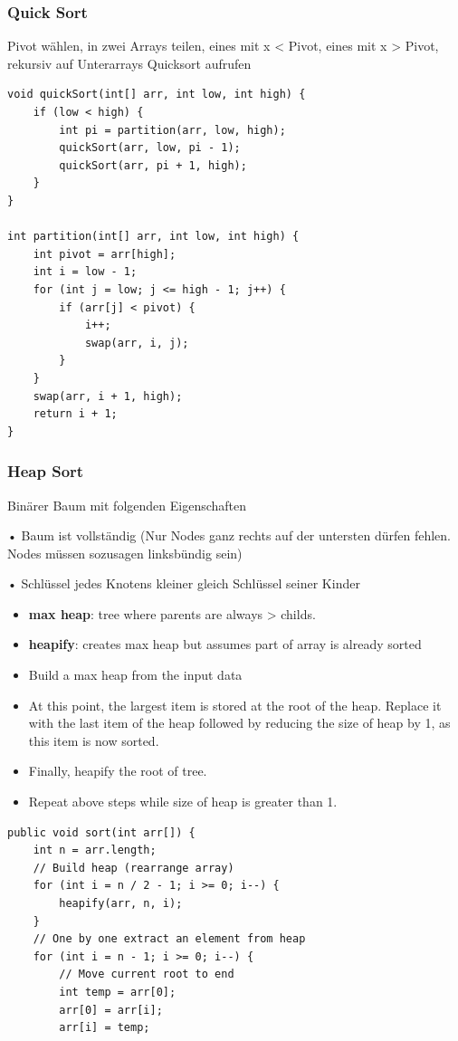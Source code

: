 \begin{multicols*}{4}
		\subsubsection{Quick Sort}
		Pivot wählen, in zwei Arrays teilen, eines mit x < Pivot, eines mit x > Pivot, rekursiv auf Unterarrays Quicksort aufrufen
			\begin{lstlisting}
void quickSort(int[] arr, int low, int high) {
	if (low < high) {
		int pi = partition(arr, low, high);
		quickSort(arr, low, pi - 1);
		quickSort(arr, pi + 1, high);
	}
}
	
int partition(int[] arr, int low, int high) {
	int pivot = arr[high];
	int i = low - 1;
	for (int j = low; j <= high - 1; j++) {
		if (arr[j] < pivot) {
			i++;
			swap(arr, i, j);
		}
	}
	swap(arr, i + 1, high);
	return i + 1;
}
			\end{lstlisting}

\columnbreak

		\subsubsection{Heap Sort}
			Binärer Baum mit folgenden Eigenschaften
			
			• Baum ist vollständig (Nur Nodes ganz rechts auf der untersten dürfen fehlen. Nodes müssen 
			sozusagen linksbündig sein)
			
			• Schlüssel jedes Knotens kleiner gleich Schlüssel seiner Kinder
		
			\begin{itemize}
				\item \textbf{max heap}: tree where parents are always > childs.
				\item \textbf{heapify}: creates max heap but assumes part of array is already sorted
				\item Build a max heap from the input data
				\item At this point, the largest item is stored at the root of the heap. Replace it with the last item of the heap followed by reducing the size of heap by 1, as this item is now sorted.
				\item Finally, heapify the root of tree.
				\item Repeat above steps while size of heap is greater than 1.			
			\end{itemize}
		
			\vspace{2pt}
			\begin{lstlisting}
public void sort(int arr[]) { 
	int n = arr.length; 
	// Build heap (rearrange array) 
	for (int i = n / 2 - 1; i >= 0; i--) {
		heapify(arr, n, i); 
	}
	// One by one extract an element from heap 
	for (int i = n - 1; i >= 0; i--) { 
		// Move current root to end 
		int temp = arr[0]; 
		arr[0] = arr[i]; 
		arr[i] = temp; 
		

\end{lstlisting}
\end{multicols*}
